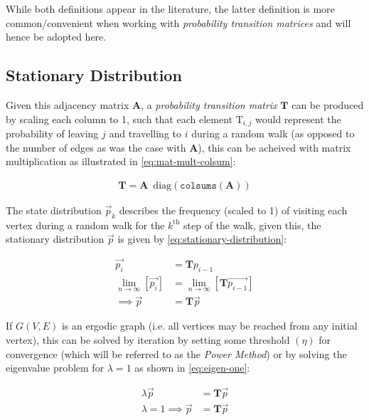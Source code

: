 \documentclass[11pt]{article}
\begin{document}
While both definitions appear in the literature, the latter definition is more
common/convenient when working with \emph{probability transition matrices} and will
hence be adopted here.
\subsection{Stationary Distribution}
\label{stationary-distribution}
Given this adjacency matrix \(\mathbf{A}\), a \emph{probability transition matrix}
\(\mathbf{T}\) can be produced by scaling each column to 1, such that each element
\(\mathrm{T}_{i, j}\) would represent the probability of leaving \(j\) and
travelling to \(i\) during a random walk (as opposed to the number of edges as was
the case with \(\mathbf{A}\)), this can
be acheived with matrix multiplication as illustrated in
\eqref{eq:mat-mult-colsum}:

\begin{align}
\mathbf{T} = \mathbf{A} \enspace \mathrm{diag}\left( \mathtt{colsums}\left(
\mathbf{A} \right) \right) \label{eq:mat-mult-colsum} \end{align}

The state distribution \(\vec{p}_{k}\) describes the frequency (scaled to 1) of
visiting each vertex during a random walk for the \(k^{\textrm{th}}\) step of the
walk, given this, the stationary distribution \(\vec{p}\) is given by
\eqref{eq:stationary-distribution}:


\begin{align}
\vec{p_{i}} &= \mathbf{T} p_{i-1} \nonumber \\ \lim_{n \to \infty} \left[
\vec{p_{i}} \right] &= \lim_{n \to \infty} \left[ \mathbf{T} \vec{p_{i-1}}
\right] \nonumber \\ \implies \vec{p} &= \mathbf{T} \vec{p}
\label{eq:stationary-distribution} \end{align}

If \(G(V, E)\) is an ergodic graph (i.e. all vertices may be reached from any
initial vertex), this can be solved by iteration by setting some threshold
\((\eta)\) for convergence (which will be referred to as the \emph{Power Method}) or by
solving the eigenvalue problem for \(\lambda=1\) as shown in \eqref{eq:eigen-one}:

\begin{align}
\lambda \vec{p} &= \mathbf{T} \vec{p} \nonumber \\ \lambda = 1 \implies \vec{p}
&= \mathbf{T} \vec{p} \label{eq:eigen-one} \end{align}
\end{document}

